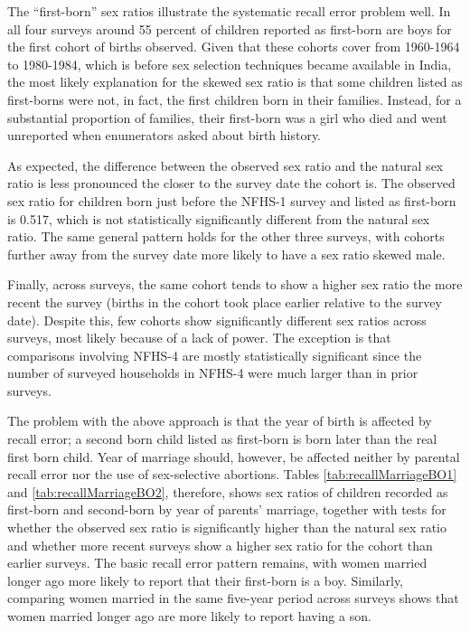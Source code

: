 \documentclass[12pt,letterpaper]{article}
\begin{document}
The ``first-born'' sex ratios illustrate the systematic recall error problem well.
In all four surveys around 55 percent of children reported as first-born are boys
for the first cohort of births observed.
Given that these cohorts cover from 1960-1964 to 1980-1984, which is before sex selection 
techniques became available in India, the most likely explanation for the skewed sex ratio 
is that some children listed as first-borns were not, in fact, the first children born in 
their families.
Instead, for a substantial proportion of families, their first-born was a girl who died 
and went unreported when enumerators asked about birth history.

As expected, the difference between the observed sex ratio and the natural sex ratio is 
less pronounced the closer to the survey date the cohort is.
The observed sex ratio for children born just before the NFHS-1 survey and listed as 
first-born is 0.517, which is not statistically significantly different from the
natural sex ratio.
The same general pattern holds for the other three surveys, with cohorts further away
from the survey date more likely to have a sex ratio skewed male.


Finally, across surveys, the same cohort tends to show a higher sex ratio the more recent 
the survey (births in the cohort took place earlier relative to the survey date).
Despite this, few cohorts show significantly different sex ratios across surveys, most 
likely because of a lack of power.
The exception is that comparisons involving NFHS-4 are mostly statistically significant
since the number of surveyed households in NFHS-4 were much larger than in prior surveys.

The problem with the above approach is that the year of birth is affected by recall error; 
a second born child listed as first-born is born later than the real first born child.
Year of marriage should, however, be affected neither by parental recall error 
nor the use of sex-selective abortions.
Tables \ref{tab:recallMarriageBO1} and \ref{tab:recallMarriageBO2}, therefore, shows sex 
ratios of children recorded as first-born and second-born by year of parents' marriage, 
together with tests for whether the observed sex ratio is significantly higher than the 
natural sex ratio and whether more recent surveys show a higher sex ratio for the cohort 
than earlier surveys.
The basic recall error pattern remains, with women married longer ago more
likely to report that their first-born is a boy.
Similarly, comparing women married in the same five-year period across surveys shows
that women married longer ago are more likely to report having a son.
\end{document}
